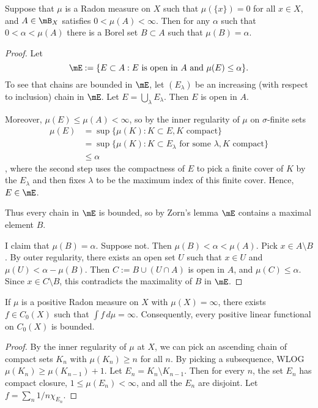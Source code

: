 \documentclass{article}
\begin{document}
 Suppose that $\mu$ is a Radon measure on $X$ such that $\mu(\{x\}) = 0$ for all $x \in X$, and
$A \in \mB_X$ satisfies $0 < \mu(A) < \infty$. Then for any $\alpha$ such that $0 < \alpha < \mu(A)$
there is a Borel set $B \subset A$ such that $\mu(B) = \alpha$.
\begin{proof}
Let 
$$\mE := \{ E \subset A : E \text{ is open in } A \text{  and  } \mu(E) \le \alpha \}.$$
To see that chains are bounded in $\mE$, let $(E_\lambda)$ be an increasing (with respect to inclusion) chain in $\mE$.
Let $E = \bigcup_\lambda E_\lambda$.  Then $E$ is open in $A$. 

Moreover, $\mu(E) \le \mu(A) < \infty$, so by the inner regularity of $\mu$ on $\sigma$-finite sets
\begin{align*}
\mu(E) & = \sup\{\mu(K): K \subset E, K \text{ compact} \}
\\ & = \sup\{\mu(K): K \subset E_\lambda \text{ for some } \lambda, K \text{ compact} \}
\\ & \le \alpha
\end{align*},
where the second step uses the compactness of $E$ to pick a finite cover of $K$ by the $E_\lambda$ and then fixes $\lambda$ to be the maximum index of this finite cover. Hence, $E \in \mE$. 

Thus every chain in $\mE$ is bounded, so by Zorn's lemma $\mE$ contains a maximal element $B$.

I claim that $\mu(B) = \alpha$. Suppose not. Then $\mu(B) < \alpha < \mu(A)$. Pick $x \in A \setminus B$.  By outer regularity,
there exists an open set $U$ such that $x \in U$ and $\mu(U) < \alpha - \mu(B)$.  Then $C := B \cup (U \cap A)$ is open in $A$, 
and $\mu(C) \le \alpha$.  Since $x \in C \setminus B$, this contradicts the maximality of $B$ in $\mE$.
\end{proof}

 If $\mu$ is a positive Radon measure on $X$ with $\mu(X) = \infty$, there exists $f \in C_0(X)$ such that
$\int f \, d\mu = \infty$. Consequently, every positive linear functional on $C_0(X)$ is bounded.
\begin{proof}
By the inner regularity of $\mu$ at $X$, we can pick an ascending chain of compact sets $K_n$ with $\mu(K_n) \ge n$ for all $n$.
By picking a subsequence, WLOG $\mu(K_n) \ge \mu(K_{n-1}) + 1$.  Let $E_n = K_n \setminus K_{n-1}$.  Then for every $n$, the set
$E_n$ has compact closure, $1 \le \mu(E_n) < \infty$, and all the $E_n$ are disjoint.  Let $f = \sum_n 1/n \chi_{E_n}$.
\end{proof}
\end{document}
